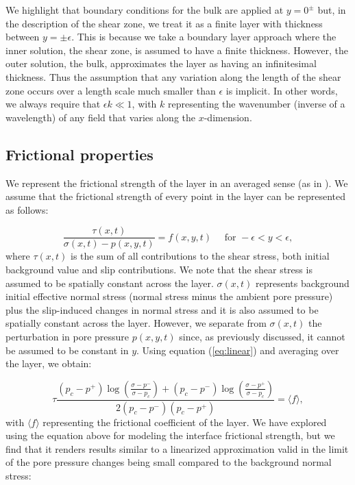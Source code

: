 \documentclass[draft]{agujournal2019}
\begin{document}
We highlight that boundary conditions for the bulk are applied at $y = 0^\pm$ but, in the description of the shear zone, we treat it as a finite layer with thickness between $y = \pm \epsilon$. This is because we take a boundary layer approach \cite<similar to Appedix B of>{Rudnicki2006} where the inner solution, the shear zone, is assumed to have a finite thickness. However, the outer solution, the bulk, approximates the layer as having an infinitesimal thickness. Thus the assumption that any variation along the length of the shear zone occurs over a length scale much smaller than $\epsilon$ is implicit. In other words, we always require that $\epsilon k \ll 1$, with $k$ representing the wavenumber (inverse of a wavelength) of any field that varies along the $x$-dimension.

\subsection{Frictional properties}

We represent the frictional strength of the layer in an averaged sense (as in ). We assume that the frictional strength of every point in the layer can be represented as follows:

\begin{equation}
\frac{\tau(x,t)}{\sigma(x,t) - p(x,y,t)} = f(x,y,t) \quad \text{ for } -\epsilon < y < \epsilon,
\label{eq:totforce}    
\end{equation}
where $\tau(x,t)$ is the sum of all contributions to the shear stress, both initial background value and slip contributions. We note that the shear stress is assumed to be spatially constant across the layer. $\sigma(x,t)$ represents background initial effective normal stress (normal stress minus the ambient pore pressure) plus the slip-induced changes in normal stress and it is also assumed to be spatially constant across the layer. However, we separate from $\sigma(x,t)$ the perturbation in pore pressure $p(x,y,t)$ since, as previously discussed, it cannot be assumed to be constant in $y$. Using equation (\ref{eq:linear}) and averaging over the layer, we obtain:

\begin{equation}
\tau \frac{ ( p_c - p^+ ) \log \left( \frac{\sigma - p^-}{\sigma - p_c} \right) +  (p_c - p^- ) \log \left( \frac{\sigma - p^+}{\sigma - p_c} \right) }{2 (p_c - p^-) (p_c - p^+)} = \langle f \rangle ,
\label{eq:totforceave}    
\end{equation}
with $\langle f \rangle$ representing the frictional coefficient of the layer. We have explored using the equation above for modeling the interface frictional strength, but we find that it renders results similar to a linearized approximation valid in the limit of the pore pressure changes being small compared to the background normal stress:
\end{document}

